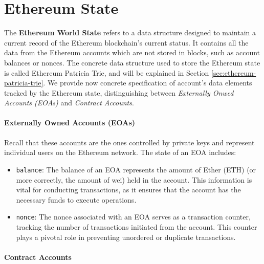 


\section{Ethereum State}

The \textbf{Ethereum World State} refers to a data structure designed to maintain a current record of the Ethereum blockchain's current status. It contains all the data from the Ethereum accounts which are not stored in blocks, such as account balances or nonces. The concrete data structure used to store the Ethereum state is called Ethereum Patricia Trie, and will be explained in Section \ref{sec:ethereum-patricia-trie}. We provide now concrete specification of account's data elements tracked by the Ethereum state, distinguishing between \textit{Externally Onwed Accounts (EOAs)} and \textit{Contract Accounts}.

\paragraph*{Externally Owned Accounts (EOAs)}

Recall that these accounts are the ones controlled by private keys and represent individual users on the Ethereum network. The state of an EOA includes:

\begin{itemize}

\item \texttt{balance}: The balance of an EOA represents the amount of Ether (ETH) (or more correctly, the amount of wei) held in the account. This information is vital for conducting transactions, as it ensures that the account has the necessary funds to execute operations.

\item \texttt{nonce}: The nonce associated with an EOA serves as a transaction counter, tracking the number of transactions initiated from the account. This counter plays a pivotal role in preventing unordered or duplicate transactions.

\end{itemize}

\paragraph*{Contract Accounts}


